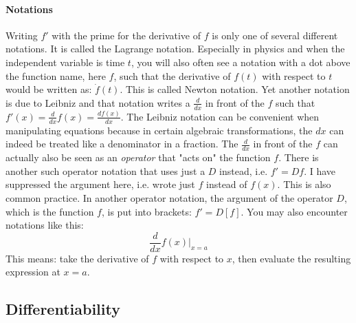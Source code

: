 \paragraph{Notations} Writing $f'$ with the prime for the derivative of $f$ is only one of several different notations. It is called the Lagrange notation. Especially in physics and when the independent variable is time $t$, you will also often see a notation with a dot above the function name, here $f$, such that the derivative of $f(t)$ with respect to $t$ would be written as: $\dot{f}(t)$. This is called Newton notation. Yet another notation is due to Leibniz and that notation writes a $\frac{d}{dx}$ in front of the $f$ such that $f'(x) = \frac{d}{dx} f(x) = \frac{d f(x)}{dx}$. The Leibniz notation can be convenient when manipulating equations because in certain algebraic transformations, the $dx$ can indeed be treated like a denominator in a fraction. The $\frac{d}{dx}$ in front of the $f$ can actually also be seen as an \emph{operator} that "acts on" the function $f$. There is another such operator notation that uses just a $D$ instead, i.e. $f' = D f$. I have suppressed the argument here, i.e. wrote just $f$ instead of $f(x)$. This is also common practice. In another operator notation, the argument of the operator $D$, which is the function $f$, is put into brackets: $f' = D[f]$. You may also encounter notations like this:
\begin{equation}
	\frac{d}{d x} f(x) \bigg\rvert_{x=a}
\end{equation}
This means: take the derivative of $f$ with respect to $x$, then evaluate the resulting expression at $x = a$.


\subsection{Differentiability}

